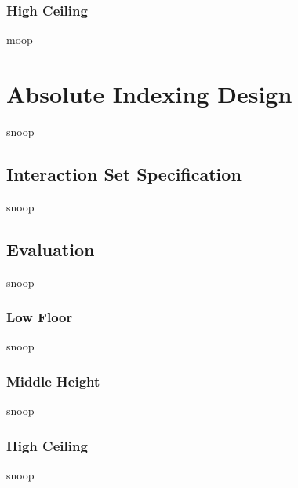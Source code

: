 \subsubsection{High Ceiling}
moop



\section{Absolute Indexing Design}
snoop
\subsection{Interaction Set Specification}
snoop
\subsection{Evaluation}
snoop
\subsubsection{Low Floor}
snoop
\subsubsection{Middle Height}
snoop
\subsubsection{High Ceiling}
snoop


